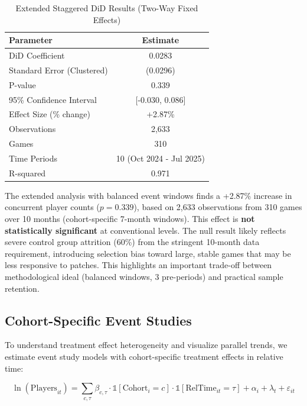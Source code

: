 \documentclass[12pt,a4paper]{article}
\begin{document}
\begin{table}[htbp]
\centering
\caption{Extended Staggered DiD Results (Two-Way Fixed Effects)}
\label{tab:extended-results}
\begin{tabular}{lc}
\toprule
\textbf{Parameter} & \textbf{Estimate} \\
\midrule
DiD Coefficient & 0.0283 \\
Standard Error (Clustered) & (0.0296) \\
P-value & 0.339 \\
95\% Confidence Interval & [-0.030, 0.086] \\
Effect Size (\% change) & +2.87\% \\
\midrule
Observations & 2,633 \\
Games & 310 \\
Time Periods & 10 (Oct 2024 - Jul 2025) \\
R-squared & 0.971 \\
\bottomrule
\end{tabular}
\end{table}

\noindent The extended analysis with balanced event windows finds a +2.87\% increase in concurrent player counts ($p=0.339$), based on 2,633 observations from 310 games over 10 months (cohort-specific 7-month windows). This effect is \textbf{not statistically significant} at conventional levels. The null result likely reflects severe control group attrition (60\%) from the stringent 10-month data requirement, introducing selection bias toward large, stable games that may be less responsive to patches. This highlights an important trade-off between methodological ideal (balanced windows, 3 pre-periods) and practical sample retention.

\subsection{Cohort-Specific Event Studies}
\label{subsec:cohort-specific}

To understand treatment effect heterogeneity and visualize parallel trends, we estimate event study models with cohort-specific treatment effects in relative time:

\begin{equation}
\ln(\text{Players}_{it}) = \sum_{c,\tau} \beta_{c,\tau} \cdot \mathbb{1}[\text{Cohort}_i=c] \cdot \mathbb{1}[\text{RelTime}_{it}=\tau] + \alpha_i + \lambda_t + \varepsilon_{it}
\label{eq:event-study-cohort}
\end{equation}
\end{document}
